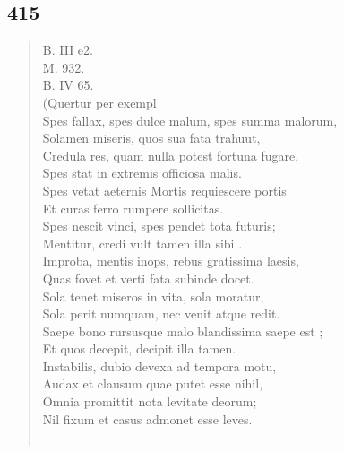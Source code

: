 \documentclass[11pt, a4paper]{report}
\begin{document}
            \subsection*{415}
      \begin{verse}
      B. III e2. \\ M. 932. \\ B. IV 65. \\ (Quertur per exempl \\ Spes fallax, spes dulce malum, spes summa malorum, \\ Solamen miseris, quos sua fata trahuut, \\ Credula res, quam nulla potest fortuna fugare, \\ Spes stat in extremis officiosa malis. \\ Spes vetat aeternis Mortis requiescere portis \\ Et curas ferro rumpere sollicitas. \\ Spes nescit vinci, spes pendet tota futuris; \\ Mentitur, credi vult tamen illa  \lbrack sibi \rbrack . \\ Improba, mentis inops, rebus gratissima laesis, \\ Quas fovet et verti fata subinde docet. \\ Sola tenet miseros in vita, sola moratur, \\ Sola perit numquam, nec venit atque redit. \\ Saepe bono rursusque malo blandissima saepe  \lbrack est \rbrack ; \\ Et quos decepit, decipit illa tamen. \\ Instabilis, dubio devexa ad tempora motu, \\ Audax et clausum quae putet esse nihil, \\ Omnia promittit nota levitate deorum; \\ Nil fixum et casus admonet esse leves. \\ 
        ﻿\pagebreak 

\end{verse}
\end{document}
